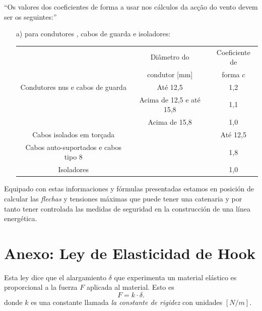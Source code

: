 ``Os valores dos coeficientes de forma a usar nos cálculos da acção do
vento devem ser os seguintes:''
\begin{itemize}[noitemsep,nolistsep]
\item[a)]  para condutores , cabos de guarda e isoladores:
  \begin{table}[!h]
    \centering
    \begin{tabular}{ccc}
      \toprule
      & Diâmetro do & Coeficiente de \\
      &  condutor [\si{mm}] & forma $c$ \\
      \midrule
      Condutores nus e cabos de guarda & Até 12,5 & 1,2\\
      & Acima de 12,5 e até 15,8 & 1,1\\
      & Acima de 15,8 & 1,0\\
      \midrule
      Cabos isolados em torçada & & Até 12,5\\
      Cabos auto-suportados e cabos tipo 8 && 1,8\\
      Isoladores && 1,0\\
      \bottomrule
    \end{tabular}
  \end{table}
\end{itemize}

Equipado con estas informaciones y fórmulas presentadas estamos en posición de calcular las \emph{flechas} y tensiones máximas que puede tener una catenaria y por tanto tener controlada las medidas de seguridad en la construcción de una línea energética.


\section*{Anexo: Ley de Elasticidad de Hook}
Esta ley dice que el alargamiento $\delta$ que experimenta un
material elástico es proporcional a la fuerza $F$ aplicada al
material. Esto es
\begin{equation}
 \label{eq:1}
 F = k \cdot \delta.
\end{equation}
donde $k$ es una constante llamada \emph{la constante de rigidez} con
unidades $[N/m]$.


